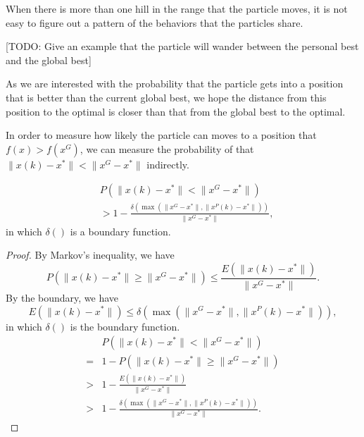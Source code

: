 When there is more than one hill in the range that the particle moves, it is not easy to figure out a pattern of the behaviors that the particles share.

[TODO: Give an example that the particle will wander between the personal best and the global best]

As we are interested with the probability that the particle gets into a position that is better than the current global best, we hope the distance from this position to the optimal is closer than that from the global best to the optimal.

In order to measure how likely the particle can moves to a position that $ f(x) > f(x^{G}) $, we can measure the probability of that $ \lVert x(k) - x^{*} \rVert < \lVert x^{G} - x^{*} \rVert $ indirectly.

\begin{mylem}
\label{lem:nonsingleHill:particle:prob}
\begin{equation}
\begin{aligned}
& P( \lVert x(k) - x^{*} \rVert < \lVert x^{G} - x^{*} \rVert ) \\
& > 1 - \frac{ \delta ( \max ( \lVert x^{G} - x^{*} \rVert , \lVert x^{P}(k) - x^{*}  \rVert ) ) }{ \lVert x^{G} - x^{*} \rVert },
\end{aligned}
\end{equation}
in which $ \delta () $ is a boundary function.
\begin{proof}
By Markov's inequality, we have
\begin{equation}
P( \lVert x(k) - x^{*} \rVert \geq \lVert x^{G} - x^{*} \rVert ) \leq \frac{ E( \lVert x(k) - x^{*} \rVert ) }{ \lVert x^{G} - x^{*} \rVert }.
\end{equation} 
By the boundary, we have
\begin{equation}
E( \lVert x(k) - x^{*} \rVert ) \leq \delta ( \max ( \lVert x^{G} - x^{*} \rVert , \lVert x^{P}(k) - x^{*}  \rVert ) ),
\end{equation}
in which $ \delta () $ is the boundary function.
\begin{equation}
\begin{aligned}
& P( \lVert x(k) - x^{*} \rVert < \lVert x^{G} - x^{*} \rVert ) \\
= & 1 - P( \lVert x(k) - x^{*} \rVert \geq \lVert x^{G} - x^{*} \rVert ) \\
> & 1 - \frac{ E( \lVert x(k) - x^{*} \rVert ) }{ \lVert x^{G} - x^{*} \rVert } \\
> & 1 - \frac{ \delta ( \max ( \lVert x^{G} - x^{*} \rVert , \lVert x^{P}(k) - x^{*}  \rVert ) ) }{ \lVert x^{G} - x^{*} \rVert }.
\end{aligned}
\end{equation}
\end{proof}
\end{mylem}


